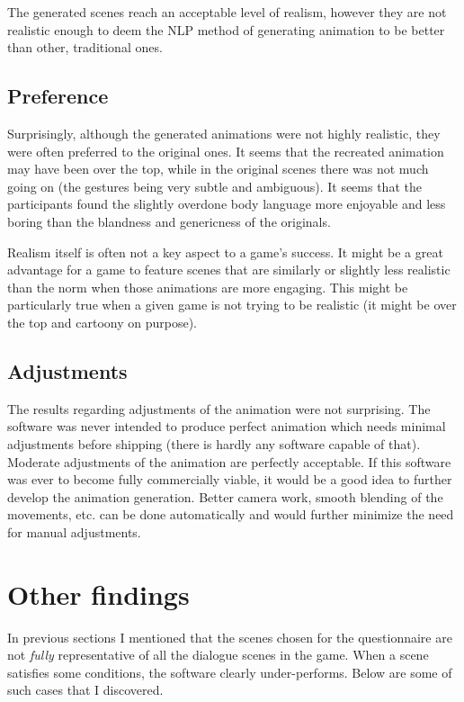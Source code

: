 The generated scenes reach an acceptable level of realism, however they are not realistic enough to deem the NLP method of generating animation to be better than other, traditional ones. 

\subsection{Preference}
Surprisingly, although the generated animations were not highly realistic, they were often preferred to the original ones. It seems that the recreated animation may have been over the top, while in the original scenes there was not much going on (the gestures being very subtle and ambiguous). It seems that the participants found the slightly overdone body language more enjoyable and less boring than the blandness and genericness of the originals.

Realism itself is often not a key aspect to a game's success. It might be a great advantage for a game to feature scenes that are similarly or slightly less realistic than the norm when those animations are more engaging. This might be particularly true when a given game is not trying to be realistic (it might be over the top and cartoony on purpose).


\subsection{Adjustments}
The results regarding adjustments of the animation were not surprising. The software was never intended to produce perfect animation which needs minimal adjustments before shipping (there is hardly any software capable of that). Moderate adjustments of the animation are perfectly acceptable. If this software was ever to become fully commercially viable, it would be a good idea to further develop the animation generation. Better camera work, smooth blending of the movements, etc. can be done automatically and would further minimize the need for manual adjustments.


\section{Other findings \label{sec:otherfindings}}
In previous sections I mentioned that the scenes chosen for the questionnaire are not \textit{fully} representative of all the dialogue scenes in the game. When a scene satisfies some conditions, the software clearly under-performs. Below are some of such cases that I discovered.

